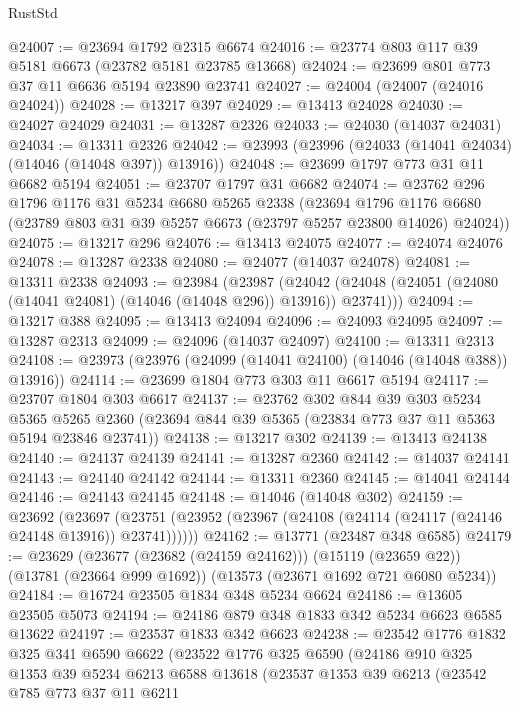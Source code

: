 \begin{lexlean}{RustStd}
\begin{coremodule}
@24007 := @23694 @1792 @2315 @6674
@24016 := @23774 @803 @117 @39 @5181 @6673 (@23782 @5181 @23785 @13668)
@24024 := @23699 @801 @773 @37 @11 @6636 @5194 @23890 @23741
@24027 := @24004 (@24007 (@24016 @24024))
@24028 := @13217 @397
@24029 := @13413 @24028
@24030 := @24027 @24029
@24031 := @13287 @2326
@24033 := @24030 (@14037 @24031)
@24034 := @13311 @2326
@24042 := @23993 (@23996 (@24033 (@14041 @24034) (@14046 (@14048 @397)) @13916))
@24048 := @23699 @1797 @773 @31 @11 @6682 @5194
@24051 := @23707 @1797 @31 @6682
@24074 := @23762
    @296
    @1796
    @1176
    @31
    @5234
    @6680
    @5265
    @2338
    (@23694 @1796 @1176 @6680 (@23789 @803 @31 @39 @5257 @6673 (@23797 @5257 @23800 @14026) @24024))
@24075 := @13217 @296
@24076 := @13413 @24075
@24077 := @24074 @24076
@24078 := @13287 @2338
@24080 := @24077 (@14037 @24078)
@24081 := @13311 @2338
@24093 := @23984
    (@23987
      (@24042 (@24048 (@24051 (@24080 (@14041 @24081) (@14046 (@14048 @296)) @13916)) @23741)))
@24094 := @13217 @388
@24095 := @13413 @24094
@24096 := @24093 @24095
@24097 := @13287 @2313
@24099 := @24096 (@14037 @24097)
@24100 := @13311 @2313
@24108 := @23973 (@23976 (@24099 (@14041 @24100) (@14046 (@14048 @388)) @13916))
@24114 := @23699 @1804 @773 @303 @11 @6617 @5194
@24117 := @23707 @1804 @303 @6617
@24137 := @23762
    @302
    @844
    @39
    @303
    @5234
    @5365
    @5265
    @2360
    (@23694 @844 @39 @5365 (@23834 @773 @37 @11 @5363 @5194 @23846 @23741))
@24138 := @13217 @302
@24139 := @13413 @24138
@24140 := @24137 @24139
@24141 := @13287 @2360
@24142 := @14037 @24141
@24143 := @24140 @24142
@24144 := @13311 @2360
@24145 := @14041 @24144
@24146 := @24143 @24145
@24148 := @14046 (@14048 @302)
@24159 := @23692
    (@23697 (@23751 (@23952 (@23967 (@24108 (@24114 (@24117 (@24146 @24148 @13916)) @23741))))))
@24162 := @13771 (@23487 @348 @6585)
@24179 := @23629
    (@23677 (@23682 (@24159 @24162)))
    (@15119 (@23659 @22))
    (@13781 (@23664 @999 @1692))
    (@13573 (@23671 @1692 @721 @6080 @5234))
@24184 := @16724 @23505 @1834 @348 @5234 @6624
@24186 := @13605 @23505 @5073
@24194 := @24186 @879 @348 @1833 @342 @5234 @6623 @6585 @13622
@24197 := @23537 @1833 @342 @6623
@24238 := @23542
    @1776
    @1832
    @325
    @341
    @6590
    @6622
    (@23522
      @1776
      @325
      @6590
      (@24186
        @910
        @325
        @1353
        @39
        @5234
        @6213
        @6588
        @13618
        (@23537
          @1353
          @39
          @6213
          (@23542
            @785
            @773
            @37
            @11
            @6211

\end{coremodule}
\end{lexlean}
